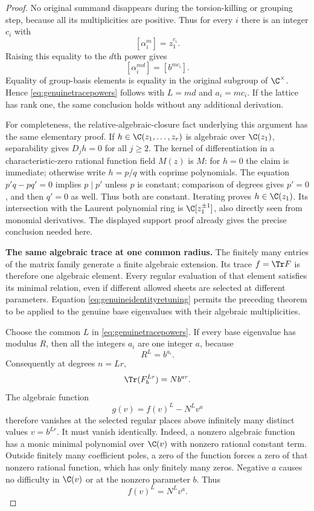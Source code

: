 \begin{proof}
No original summand disappears during the torsion-killing
or grouping step, because all its multiplicities are
positive. Thus for every $i$ there is an integer $c_i$
with
\[
 [\alpha_i^m]=z_1^{c_i}.
\]
Raising this equality to the $d$th power gives
\[
 [\alpha_i^{md}]=[b^{mc_i}].
\]
Equality of group-basis elements is equality in the
original subgroup of $\C^\times$.
Hence \eqref{eq:genuinetracepowers} follows with
$L=md$ and $a_i=mc_i$.
If the lattice has rank one, the same conclusion holds
without any additional derivation.

For completeness, the relative-algebraic-closure fact
underlying this argument has the same elementary proof.
If $h\in\C(z_1,\ldots,z_r)$ is algebraic over $\C(z_1)$,
separability gives $D_jh=0$ for all $j\ge2$.
The kernel of differentiation in a characteristic-zero
rational function field $M(z)$ is $M$:
for $h=0$ the claim is immediate; otherwise write
$h=p/q$ with coprime polynomials.
The equation $p'q-pq'=0$ implies $p\mid p'$ unless
$p$ is constant; comparison of degrees gives $p'=0$,
and then $q'=0$ as well.
Thus both are constant.
Iterating proves $h\in\C(z_1)$.
Its intersection with the Laurent polynomial ring is
$\C[z_1^{\pm1}]$, also directly seen from monomial
derivatives. The displayed support proof already gives
the precise conclusion needed here.

\par\smallskip\noindent\textbf{The same algebraic trace at one common radius.}\quad
The finitely many entries of the matrix family generate
a finite algebraic extension.
Its trace $f=\Tr F$ is therefore one algebraic element.
Every regular evaluation of that element satisfies
its minimal relation, even if different allowed sheets
are selected at different parameters.
Equation \eqref{eq:genuineidentityretuning} permits the
preceding theorem to be applied to the genuine base
eigenvalues with their algebraic multiplicities.

Choose the common $L$ in \eqref{eq:genuinetracepowers}.
If every base eigenvalue has modulus $R$, then all
the integers $a_i$ are one integer $a$, because
\[
 R^L=b^{a_i}.
\]
Consequently at degrees $n=Lr$,
\[
 \Tr(F_b^{Lr})=N b^{ar}.
\]
The algebraic function
\[
 g(v)=f(v)^L-N^L v^a
\]
therefore vanishes at the selected regular places
above infinitely many distinct values $v=b^{Lr}$.
It must vanish identically.
Indeed, a nonzero algebraic function has a monic
minimal polynomial over $\C(v)$ with nonzero rational
constant term. Outside finitely many coefficient
poles, a zero of the function forces a zero of that
nonzero rational function, which has only finitely
many zeros.
Negative $a$ causes no difficulty in $\C(v)$ or
at the nonzero parameter $b$.
Thus
\begin{equation}\label{eq:commonradiustraceidentity}
 f(v)^L=N^L v^a.
\end{equation}


\end{proof}
